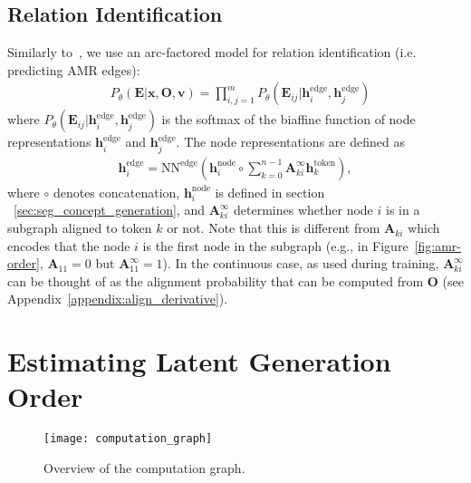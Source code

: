 \documentclass[11pt]{article}
\begin{document}
\subsection{Relation Identification}
\label{subsect:rel}
Similarly to~, we use an arc-factored model for relation identification (i.e. predicting AMR edges): \begin{align}
&P_\theta(\mathbf{E}|\mathbf{x},\mathbf{O},\mathbf{v}) = \prod_{i,j=1}^m P_\theta(\mathbf{E}_{ij}|\mathbf{h}^{\mathrm{edge}}_i,\mathbf{h}^{\mathrm{edge}}_j)  
\end{align}
where $P_\theta(\mathbf{E}_{ij}|\mathbf{h}^{\mathrm{edge}}_i,\mathbf{h}^{\mathrm{edge}}_j)  $ is the softmax of the biaffine function of node representations  $\mathbf{h}^{\mathrm{edge}}_i$ and $\mathbf{h}^{\mathrm{edge}}_j$.
The  node representations are defined as \begin{align}\mathbf{h}^{\mathrm{edge}}_i=
 \mathrm{NN}^{\mathrm{edge}}(\mathbf{h}^{\mathrm{node}}_i\circ \sum_{k=0}^{n-1}\mathbf{A}^\mathrm{\infty}_{ki}\mathbf{h}^{\mathrm{token}}_k),\end{align}
where $\circ$ denotes concatenation, $\mathbf{h}^{\mathrm{node}}_i$ is defined in section ~\ref{sec:seg_concept_generation}, and $\mathbf{A}^\mathrm{\infty}_{ki}$ determines whether node $i$ is in a subgraph aligned to token $k$ or not. Note that this is different from $\mathbf{A}_{ki}$ which encodes that the node $i$ is the first node in the subgraph (e.g., in Figure~\ref{fig:amr-order},
$\mathbf{A}_{11} =0$ but $\mathbf{A}^\mathrm{\infty}_{11}=1$). In the continuous case, as  used during training, $\mathbf{A}^\mathrm{\infty}_{ki}$  can be thought of as the alignment probability that can be computed
from $\mathbf{O}$ (see Appendix~\ref{appendix:align_derivative}). 








\section{Estimating Latent Generation Order} \label{sec:latent}


\begin{figure}[t!]
\centering
\texttt{[image: computation\_graph]}
\vspace{-2ex}
\caption{Overview of the computation graph.}
\label{fig:comp-graph}
\end{figure}
\end{document}
